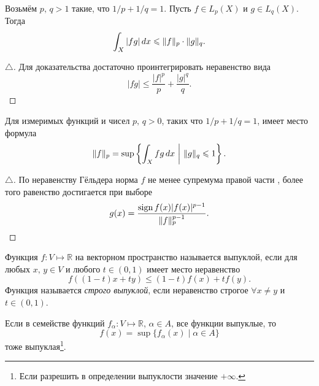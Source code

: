 \begin{to_thr}
    Возьмём $p, \, q > 1$ такие, что $1/p + 1/q = 1$. Пусть $f \in L_p (X)$ и $g \in L_q(X)$. Тогда
    \begin{equation*}
        \int_X |fg| \, d x \leqslant \|f\|_p \cdot \|g\|_q.
    \end{equation*}
\end{to_thr}

\begin{proof}[$\triangle$]
    Для доказательства достаточно проинтегрировать неравенство вида
    \begin{equation*}
        |fg| \leq \frac{|f|^p}{p} + \frac{|g|^q}{q}.
    \end{equation*}
\end{proof}

\begin{to_con}
    Для измеримых функций и чисел $p, \, q > 0$, таких что $1/p + 1/q = 1$, имеет место формула
    \begin{equation}
        \label{8_1}
        \|f\|_p = \sup \left\{
            \int_X fg \, d x \ \bigg| \  \|g\|_q \leqslant 1
        \right\}.
    \end{equation}
\end{to_con}


\begin{proof}[$\triangle$]
По неравенству Гёльдера норма $f$ не менее супремума правой части , более того равенство достигается при выборе
\begin{equation*}
    g(x) = \frac{\mathop{\mathrm{sign}}\nolimits f(x) |f(x)|^{p-1}}{\|f\|_p^{p-1}}.
\end{equation*}
\end{proof}

\begin{to_def}
    Функция $f \colon V \mapsto \mathbb{R}$ на векторном пространство называется выпуклой, если для любых $x, \, y \in V$ и любого $t \in (0, 1)$ имеет место неравенство
    \begin{equation*}
        f ( (1-t) x + ty) \leq (1-t) f(x) + t f(y).
    \end{equation*}
    Функция называется \textit{строго выпуклой}, если неравенство строгое $\forall x \neq y$ и $t \in (0, 1)$. 
\end{to_def}

\begin{to_lem}
    Если в семействе функций $f_\alpha \colon V \mapsto \mathbb{R}$, $\alpha \in A$, все функции выпуклые, то
    \begin{equation*}
        f(x) = \sup \{f_\alpha (x) \mid \alpha \in A\}
    \end{equation*}
    тоже выпуклая\footnote{
        Если разрешить в определении выпуклости значение $+ \infty$.
    }.
\end{to_lem}


